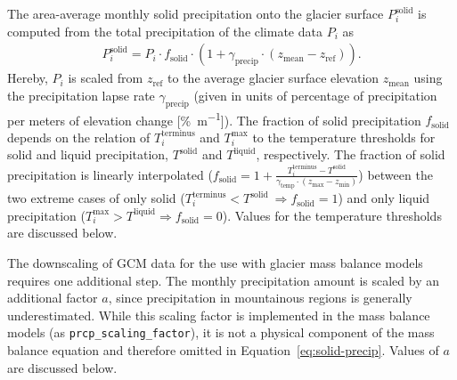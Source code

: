         The area-average monthly solid precipitation onto the glacier surface $P_i^\text{solid}$ is computed from the total precipitation of the climate data $P_i$ as
        \begin{align}\label{eq:solid-precip}
            P_i^\text{solid} = P_i \cdot f_\text{solid} \cdot (1 + \gamma_\text{precip} \cdot (z_\text{mean} - z_\text{ref})).
        \end{align}
        Hereby, $P_i$ is scaled from $z_\text{ref}$ to the average glacier surface elevation $z_\text{mean}$ using the precipitation lapse rate $\gamma_\text{precip}$ (given in units of percentage of precipitation per meters of elevation change [\si{\percent\per\meter}]). The fraction of solid precipitation $f_\text{solid}$ depends on the relation of $T_i^\text{terminus}$ and $T_{i}^\text{max}$ to the temperature thresholds for solid and liquid precipitation, $T^\text{solid}$ and $T^\text{liquid}$, respectively. The fraction of solid precipitation is linearly interpolated ($f_\text{solid} = 1 + \frac{T_{i}^\text{terminus} - T^\text{solid}}{\gamma_\text{temp}\cdot(z_\text{max} - z_\text{min})}$) between the two extreme cases of only solid ($T_i^\text{terminus} < T^\text{solid} \ \Rightarrow f_\text{solid} = 1$) and only liquid precipitation ($T_i^\text{max} > T^\text{liquid} \Rightarrow f_\text{solid} = 0$). Values for the temperature thresholds are discussed below.

        
        The downscaling of GCM data for the use with glacier mass balance models requires one additional step. The monthly precipitation amount is scaled by an additional factor $a$, since precipitation in mountainous regions is generally underestimated. While this scaling factor is implemented in the mass balance models (as \lstinline`prcp_scaling_factor`), it is not a physical component of the  mass balance equation and therefore omitted in Equation~\ref{eq:solid-precip}. Values of $a$ are discussed below.

